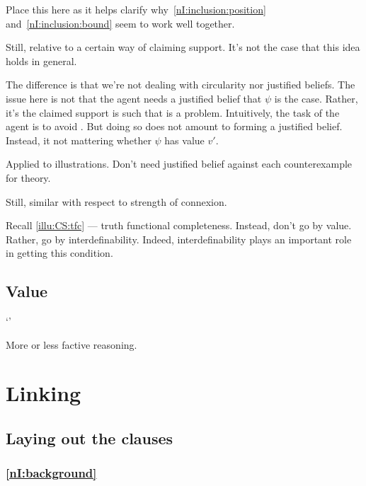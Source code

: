 \begin{note}[Literature]
  {
    \color{red}
    Place this here as it helps clarify why~\ref{nI:inclusion:position} and~\ref{nI:inclusion:bound} seem to work well together.
  }

  Still, relative to a certain way of claiming support.
  It's not the case that this idea holds in general.

  The difference is that we're not dealing with circularity nor justified beliefs.
  The issue here is not that the agent needs a justified belief that \(\psi\) is the case.
  Rather, it's the claimed support is such that \expec{} is a problem.
  Intuitively, the task of the agent is to avoid \expec{}.
  But doing so does not amount to forming a justified belief.
  Instead, it not mattering whether \(\psi\) has value \(v'\).

  Applied to illustrations.
  Don't need justified belief against each counterexample for theory.

  Still, similar with respect to strength of connexion.
\end{note}

\begin{note}
  \color{red}
  Recall \autoref{illu:CS:tfc} --- truth functional completeness.
  Instead, don't go by value.
  Rather, go by interdefinability.
  Indeed, interdefinability plays an important role in getting this condition.
\end{note}

\subsection{Value}

\begin{note}
  `\RBV{-}'

  More or less factive reasoning.
\end{note}

\section{Linking}
\label{sec:nI:arg:linking}

\subsection{Laying out the clauses}

\subsubsection{\ref{nI:background}}

